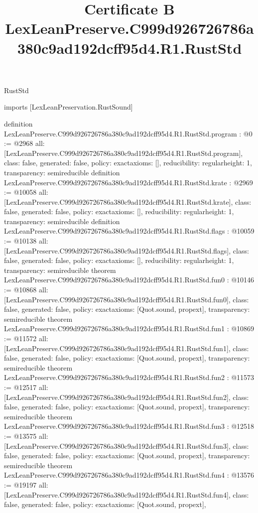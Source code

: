 \begin{lexlean}{RustStd}
\title{Certificate B LexLeanPreserve.C999d926726786a380c9ad192dcff95d4.R1.RustStd}
\begin{coremodule}
imports [LexLeanPreservation.RustSound]

definition LexLeanPreserve.C999d926726786a380c9ad192dcff95d4.R1.RustStd.program : @0 := @2968 {
  all: [LexLeanPreserve.C999d926726786a380c9ad192dcff95d4.R1.RustStd.program],
  class: false,
  generated: false,
  policy: exact{axioms: []},
  reducibility: regular{height: 1},
  transparency: semireducible
}
definition LexLeanPreserve.C999d926726786a380c9ad192dcff95d4.R1.RustStd.krate : @2969 := @10058 {
  all: [LexLeanPreserve.C999d926726786a380c9ad192dcff95d4.R1.RustStd.krate],
  class: false,
  generated: false,
  policy: exact{axioms: []},
  reducibility: regular{height: 1},
  transparency: semireducible
}
definition LexLeanPreserve.C999d926726786a380c9ad192dcff95d4.R1.RustStd.flags : @10059 := @10138 {
  all: [LexLeanPreserve.C999d926726786a380c9ad192dcff95d4.R1.RustStd.flags],
  class: false,
  generated: false,
  policy: exact{axioms: []},
  reducibility: regular{height: 1},
  transparency: semireducible
}
theorem LexLeanPreserve.C999d926726786a380c9ad192dcff95d4.R1.RustStd.fun0 : @10146 := @10868 {
  all: [LexLeanPreserve.C999d926726786a380c9ad192dcff95d4.R1.RustStd.fun0],
  class: false,
  generated: false,
  policy: exact{axioms: [Quot.sound, propext]},
  transparency: semireducible
}
theorem LexLeanPreserve.C999d926726786a380c9ad192dcff95d4.R1.RustStd.fun1 : @10869 := @11572 {
  all: [LexLeanPreserve.C999d926726786a380c9ad192dcff95d4.R1.RustStd.fun1],
  class: false,
  generated: false,
  policy: exact{axioms: [Quot.sound, propext]},
  transparency: semireducible
}
theorem LexLeanPreserve.C999d926726786a380c9ad192dcff95d4.R1.RustStd.fun2 : @11573 := @12517 {
  all: [LexLeanPreserve.C999d926726786a380c9ad192dcff95d4.R1.RustStd.fun2],
  class: false,
  generated: false,
  policy: exact{axioms: [Quot.sound, propext]},
  transparency: semireducible
}
theorem LexLeanPreserve.C999d926726786a380c9ad192dcff95d4.R1.RustStd.fun3 : @12518 := @13575 {
  all: [LexLeanPreserve.C999d926726786a380c9ad192dcff95d4.R1.RustStd.fun3],
  class: false,
  generated: false,
  policy: exact{axioms: [Quot.sound, propext]},
  transparency: semireducible
}
theorem LexLeanPreserve.C999d926726786a380c9ad192dcff95d4.R1.RustStd.fun4 : @13576 := @19197 {
  all: [LexLeanPreserve.C999d926726786a380c9ad192dcff95d4.R1.RustStd.fun4],
  class: false,
  generated: false,
  policy: exact{axioms: [Quot.sound, propext]},
}
\end{coremodule}
\end{lexlean}
